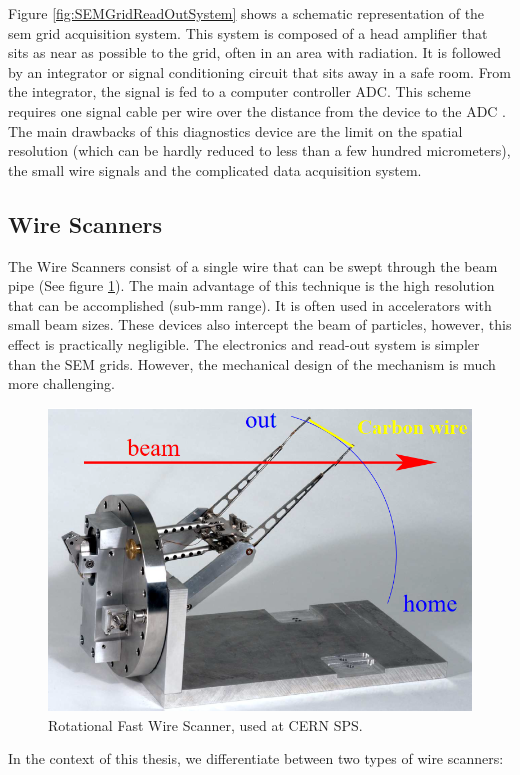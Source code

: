 Figure \ref{fig:SEMGridReadOutSystem} shows a schematic representation of the sem grid acquisition system. This system is composed of a head amplifier that sits as near as possible to the grid, often in an area with radiation. It is followed by an integrator or signal conditioning circuit that sits away in a safe room. From the integrator, the signal is fed to a computer controller ADC. This scheme requires one signal cable per wire over the distance from the device to the ADC \parencite[][]{ref:CASEnrico}. The main drawbacks of this diagnostics device are the limit on the spatial resolution (which can be hardly reduced to less than a few hundred micrometers), the small wire signals and the complicated data acquisition system. 

\subsection{Wire Scanners}
\label{sec:WireScan}

The Wire Scanners consist of a single wire that can be swept through the beam pipe (See figure \ref{fig:WireScan}). The main advantage of this technique is the high resolution that can be accomplished (sub-mm range). It is often used in accelerators with small beam sizes. These devices also intercept the beam of particles, however, this effect is practically negligible. The electronics and read-out system is simpler than the SEM grids. However, the mechanical design of the mechanism is much more challenging.

\begin{figure}[h]
    \centering
    \includegraphics[width=0.6\columnwidth]{WireScanner/WireScanner.png}
    \caption{Rotational Fast Wire Scanner, used at CERN SPS. }
    \label{fig:WireScan}
\end{figure}

In the context of this thesis, we differentiate between two types of wire scanners:

